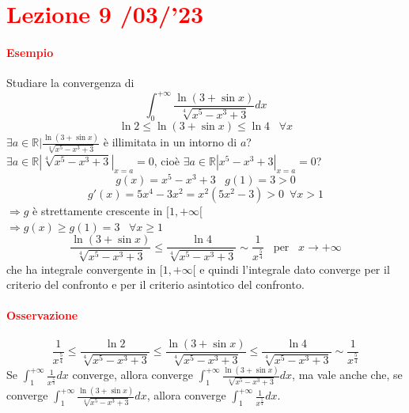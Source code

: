\documentclass{article}
\newcommand{\R}{\mathbb{R}}
\begin{document}
\newpage
\section{\textcolor{red}{Lezione 9 \space{}/03/'23}}
\paragraph{\textcolor{red}{Esempio}}
Studiare la convergenza di 
\begin{equation*}
    \int_{0}^{+\infty}\frac{\ln(3+\sin x)}{\sqrt[4]{x^5-x^3+3}}dx
\end{equation*}
\begin{equation*}
    \ln2 \leq \ln(3+\sin x) \leq \ln 4 \,\,\,\,\, \forall x 
\end{equation*}
$\exists a \in \R | \frac{\ln(3+\sin x)}{\sqrt[4]{x^5-x^3+3}} $ è illimitata in un intorno di $a$?\\
$\exists a \in \R | \sqrt[4]{x^5-x^3+3} |_{x=a}=0$, cioè $\exists a \in \R | x^5-x^3+3|_{x=a}=0$?
\begin{equation*}
    g(x)=x^5-x^3+3 \,\,\,\,\, g(1)=3 > 0
\end{equation*}
\begin{equation*}
    g'(x)=5x^4-3x^2=x^2(5x^2-3)>0 \,\,\, \forall x >1
\end{equation*}
$\Rightarrow g$ è strettamente crescente in $[1,+\infty[$\\
$\Rightarrow g(x) \geq g(1)=3 \,\,\,\,\, \forall x \geq 1$
\begin{equation*}
    \frac{\ln(3+\sin x)}{\sqrt[4]{x^5-x^3+3}} \leq \frac{\ln 4}{\sqrt[4]{x^5-x^3+3}} \sim \frac{1}{x^{\frac{5}{4}}} \,\,\,\,\, \text{per} \,\,\,\,\, x \rightarrow +\infty
\end{equation*}
che ha integrale convergente in $[1, +\infty[$ e quindi l'integrale dato converge per il criterio del confronto e per il criterio asintotico del confronto.

\paragraph{\textcolor{red}{Osservazione}}
\begin{equation*}
  \frac{1}{x^{\frac{5}{4}}}  \leq   \frac{\ln 2}{\sqrt[4]{x^5-x^3+3}}  \leq \frac{\ln(3+\sin x)}{\sqrt[4]{x^5-x^3+3}} \leq  \frac{\ln 4}{\sqrt[4]{x^5-x^3+3}}  \sim \frac{1}{x^{\frac{5}{4}}}
\end{equation*}
Se $\int_{1}^{+\infty} \frac{1}{x^{\frac{5}{4}}}dx$ converge, allora converge $ \int_{1}^{+\infty}\frac{\ln(3+\sin x)}{\sqrt[4]{x^5-x^3+3}}dx$, ma vale anche che, se converge $\int_{1}^{+\infty} \frac{\ln(3+\sin x)}{\sqrt[4]{x^5-x^3+3}} dx$, allora converge $\int_{1}^{+\infty} \frac{1}{x^{\frac{5}{4}}}dx$.
\end{document}
